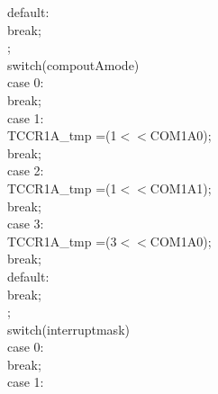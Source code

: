 \documentclass[titlepage, a4paper, 10pt, reqno, openany]{report}
\begin{document}
\begin{minipage}[t]{.35\linewidth}
\tiny
\hspace*{1cm}		default: \\
\hspace*{1.5cm}			break; \\
\hspace*{.5cm}	\textbraceright ; \\
\hspace*{.5cm}	switch(compoutAmode)\textbraceleft \\
\hspace*{1cm}		case 0: \\
\hspace*{1.5cm}			break; \\
\hspace*{1cm}		case 1: \\
\hspace*{1.5cm}			TCCR1A\_tmp \textbar =(1$<<$COM1A0); \\
\hspace*{1.5cm}			break; \\
\hspace*{1cm}		case 2: \\
\hspace*{1.5cm}			TCCR1A\_tmp \textbar =(1$<<$COM1A1); \\
\hspace*{1.5cm}			break; \\
\hspace*{1cm}		case 3: \\
\hspace*{1.5cm}			TCCR1A\_tmp \textbar =(3$<<$COM1A0); \\
\hspace*{1.5cm}			break; \\
\hspace*{1cm}		default: \\
\hspace*{1.5cm}			break; \\
\hspace*{.5cm}	\textbraceright ; \\
\hspace*{.5cm}	switch(interruptmask)\textbraceleft \\
\hspace*{1cm}		case 0: \\
\hspace*{1.5cm}			break; \\
\hspace*{1cm}		case 1: \\

\end{minipage}
\end{document}
